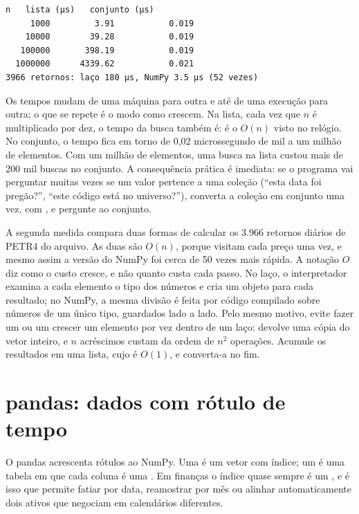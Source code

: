
\begin{lstlisting}[style=saida]
        n   lista (µs)   conjunto (µs)
     1000         3.91           0.019
    10000        39.28           0.019
   100000       398.19           0.019
  1000000      4339.62           0.021
3966 retornos: laço 180 µs, NumPy 3.5 µs (52 vezes)
\end{lstlisting}

Os tempos mudam de uma máquina para outra e até de uma execução para outra; o que se repete é o modo como crescem. Na lista, cada vez que $n$ é multiplicado por dez, o tempo da busca também é: é o $O(n)$ visto no relógio. No conjunto, o tempo fica em torno de 0,02 microssegundo de mil a um milhão de elementos. Com um milhão de elementos, uma busca na lista custou mais de 200 mil buscas no conjunto. A consequência prática é imediata: se o programa vai perguntar muitas vezes se um valor pertence a uma coleção (``esta data foi pregão?'', ``este código está no universo?''), converta a coleção em conjunto uma vez, com , e pergunte ao conjunto.

A segunda medida compara duas formas de calcular os 3.966 retornos diários de PETR4 do arquivo. As duas são $O(n)$, porque visitam cada preço uma vez, e mesmo assim a versão do NumPy foi cerca de 50 vezes mais rápida. A notação $O$ diz como o custo cresce, e não quanto custa cada passo. No laço, o interpretador examina a cada elemento o tipo dos números e cria um objeto para cada resultado; no NumPy, a mesma divisão é feita por código compilado sobre números de um único tipo, guardados lado a lado. Pelo mesmo motivo, evite fazer um  ou um  crescer um elemento por vez dentro de um laço:  devolve uma cópia do vetor inteiro, e $n$ acréscimos custam da ordem de $n^2$ operações. Acumule os resultados em uma lista, cujo  é $O(1)$, e converta-a no fim.

\section{pandas: dados com rótulo de tempo}

O pandas acrescenta rótulos ao NumPy. Uma  é um vetor com índice; um  é uma tabela em que cada coluna é uma . Em finanças o índice quase sempre é um , e é isso que permite fatiar por data, reamostrar por mês ou alinhar automaticamente dois ativos que negociam em calendários diferentes.

